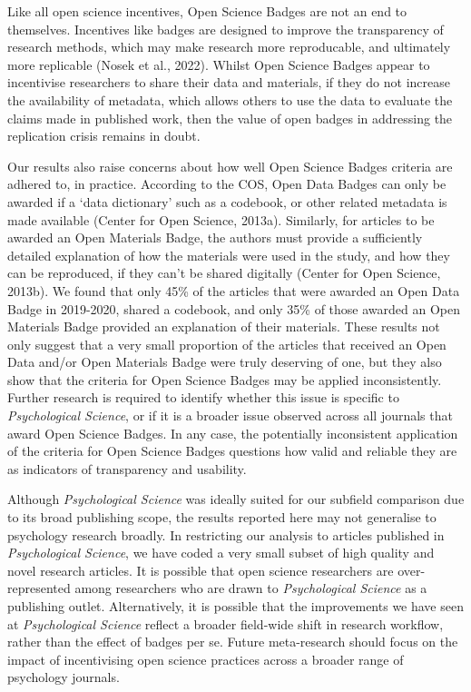 \documentclass[
  english,
  man,floatsintext]{apa6}
\begin{document}
Like all open science incentives, Open Science Badges are not an end to themselves. Incentives like badges are designed to improve the transparency of research methods, which may make research more reproducable, and ultimately more replicable (Nosek et al., 2022). Whilst Open Science Badges appear to incentivise researchers to share their data and materials, if they do not increase the availability of metadata, which allows others to use the data to evaluate the claims made in published work, then the value of open badges in addressing the replication crisis remains in doubt.

Our results also raise concerns about how well Open Science Badges criteria are adhered to, in practice. According to the COS, Open Data Badges can only be awarded if a `data dictionary' such as a codebook, or other related metadata is made available (Center for Open Science, 2013a). Similarly, for articles to be awarded an Open Materials Badge, the authors must provide a sufficiently detailed explanation of how the materials were used in the study, and how they can be reproduced, if they can't be shared digitally (Center for Open Science, 2013b). We found that only 45\% of the articles that were awarded an Open Data Badge in 2019-2020, shared a codebook, and only 35\% of those awarded an Open Materials Badge provided an explanation of their materials. These results not only suggest that a very small proportion of the articles that received an Open Data and/or Open Materials Badge were truly deserving of one, but they also show that the criteria for Open Science Badges may be applied inconsistently. Further research is required to identify whether this issue is specific to \emph{Psychological Science}, or if it is a broader issue observed across all journals that award Open Science Badges. In any case, the potentially inconsistent application of the criteria for Open Science Badges questions how valid and reliable they are as indicators of transparency and usability.

Although \emph{Psychological Science} was ideally suited for our subfield comparison due to its broad publishing scope, the results reported here may not generalise to psychology research broadly. In restricting our analysis to articles published in \emph{Psychological Science}, we have coded a very small subset of high quality and novel research articles. It is possible that open science researchers are over-represented among researchers who are drawn to \emph{Psychological Science} as a publishing outlet. Alternatively, it is possible that the improvements we have seen at \emph{Psychological Science} reflect a broader field-wide shift in research workflow, rather than the effect of badges per se. Future meta-research should focus on the impact of incentivising open science practices across a broader range of psychology journals.
\end{document}
